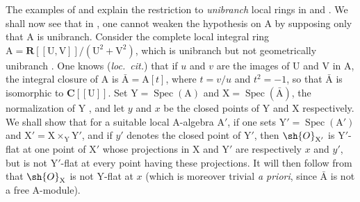 \begin{env}[11.7.5]
\label{IV.11.7.5}
The examples of  and  explain the restriction to \emph{unibranch} local rings in  and .
We shall now see that in , one cannot weaken the hypothesis on $\mathrm{A}$ by supposing only that $\mathrm{A}$ is unibranch.
Consider the complete local integral ring $\mathrm{A}=\mathbf{R}[[\mathrm{U},\mathrm{V}]]/(\mathrm{U}^2+\mathrm{V}^2)$, which is unibranch but not geometrically unibranch .
One knows (\emph{loc.\ cit.}) that if $u$ and $v$ are the images of $\mathrm{U}$ and $\mathrm{V}$ in $\mathrm{A}$, the integral closure of $\mathrm{A}$ is $\bar{\mathrm{A}}=\mathrm{A}[t]$, where $t=v/u$ and $t^2=-1$, so that $\bar{\mathrm{A}}$ is isomorphic to $\mathbf{C}[[\mathrm{U}]]$.
Set $\mathrm{Y}=\operatorname{Spec}(\mathrm{A})$ and $\mathrm{X}=\operatorname{Spec}(\bar{\mathrm{A}})$, the normalization of $\mathrm{Y}$ , and let $y$ and $x$ be the closed points of $\mathrm{Y}$ and $\mathrm{X}$ respectively.
We shall show that for a suitable local $\mathrm{A}$-algebra $\mathrm{A}'$, if one sets $\mathrm{Y}'=\operatorname{Spec}(\mathrm{A}')$ and $\mathrm{X}'=\mathrm{X}\times_\mathrm{Y}\mathrm{Y}'$, and if $y'$ denotes the closed point of $\mathrm{Y}'$, then $\sh{O}_{\mathrm{X}'}$ is $\mathrm{Y}'$-flat at one point of $\mathrm{X}'$ whose projections in $\mathrm{X}$ and $\mathrm{Y}'$ are respectively $x$ and $y'$, but is not $\mathrm{Y}'$-flat at every point having these projections.
It will then follow from  that $\sh{O}_\mathrm{X}$ is not $\mathrm{Y}$-flat at $x$ (which is moreover trivial \emph{a priori}, since $\bar{\mathrm{A}}$ is not a free $\mathrm{A}$-module).


\end{env}
